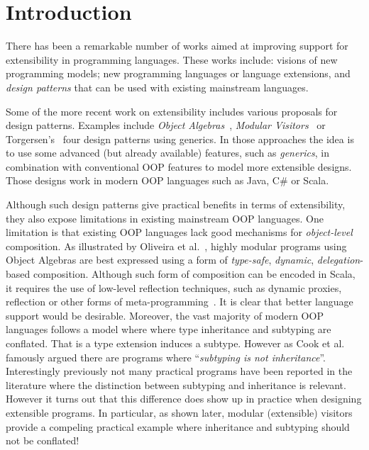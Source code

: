 \section{Introduction}


There has been a remarkable number of works aimed at improving support
for extensibility in programming languages. These works include:
visions of new programming models\cite{}; new programming languages or
language extensions\cite{}, and \emph{design patterns} that can be
used with existing mainstream languages.


Some of the more recent work on extensibility includes various
proposals for design patterns.  Examples include \emph{Object
  Algebras}~\cite{}, \emph{Modular Visitors}~\cite{} or
Torgersen's~\cite{} four design patterns using generics. In those
approaches the idea is to use some advanced (but already available)
features, such as \emph{generics}, in combination with conventional OOP
features to model more extensible designs. Those designs work in
modern OOP languages such as Java, C\# or Scala. 

Although such design patterns give practical benefits in terms of
extensibility, they also expose limitations in existing mainstream OOP
languages. One limitation is that existing OOP languages lack good
mechanisms for \emph{object-level} composition.  As illustrated by
Oliveira et al.~\cite{}, highly modular programs using Object Algebras
are best expressed using a form of \emph{type-safe}, \emph{dynamic},
\emph{delegation}-based composition. Although such form of composition
can be encoded in Scala, it requires the use of low-level reflection
techniques, such as dynamic proxies, reflection or other forms of
meta-programming~\cite{}. It is clear that better language support
would be desirable. Moreover, the vast majority of modern OOP
languages follows a model where where type inheritance and subtyping
are conflated. That is a type extension induces a subtype. However as
Cook et al.~\cite{} famously argued there are programs where
``\emph{subtyping is not inheritance}''. Interestingly previously not
many practical programs have been reported in the literature where the
distinction between subtyping and inheritance is relevant. However it
turns out that this difference does show up in practice when designing
extensible programs. In particular, as shown later, modular
(extensible) visitors provide a compeling practical example where
inheritance and subtyping should not be conflated!

